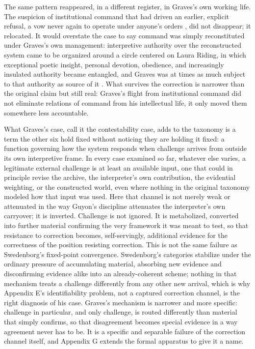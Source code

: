 \documentclass[11pt]{article}
\begin{document}
The same pattern reappeared, in a different register, in Graves's own working life. The suspicion of institutional command that had driven an earlier, explicit refusal, a vow never again to operate under anyone's orders \cite{graves1929}, did not disappear; it relocated. It would overstate the case to say command was simply reconstituted under Graves's own management: interpretive authority over the reconstructed system came to be organized around a circle centered on Laura Riding, in which exceptional poetic insight, personal devotion, obedience, and increasingly insulated authority became entangled, and Graves was at times as much subject to that authority as source of it \cite{seymour1995,rgraves1995}. What survives the correction is narrower than the original claim but still real: Graves's flight from institutional command did not eliminate relations of command from his intellectual life, it only moved them somewhere less accountable.

What Graves's case, call it the contestability case, adds to the taxonomy is a term the other six hold fixed without noticing they are holding it fixed: a function governing how the system responds when challenge arrives from outside its own interpretive frame. In every case examined so far, whatever else varies, a legitimate external challenge is at least an available input, one that could in principle revise the archive, the interpreter's own contribution, the evidential weighting, or the constructed world, even where nothing in the original taxonomy modeled how that input was used. Here that channel is not merely weak or attenuated in the way Guyon's discipline attenuates the interpreter's own carryover; it is inverted. Challenge is not ignored. It is metabolized, converted into further material confirming the very framework it was meant to test, so that resistance to correction becomes, self-servingly, additional evidence for the correctness of the position resisting correction. This is not the same failure as Swedenborg's fixed-point convergence. Swedenborg's categories stabilize under the ordinary pressure of accumulating material, absorbing new evidence and disconfirming evidence alike into an already-coherent scheme; nothing in that mechanism treats a challenge differently from any other new arrival, which is why Appendix E's identifiability problem, not a captured correction channel, is the right diagnosis of his case. Graves's mechanism is narrower and more specific: challenge in particular, and only challenge, is routed differently than material that simply confirms, so that disagreement becomes special evidence in a way agreement never has to be. It is a specific and separable failure of the correction channel itself, and Appendix G extends the formal apparatus to give it a name.
\end{document}
